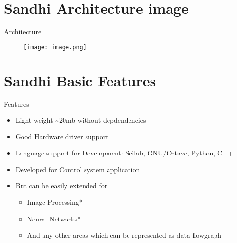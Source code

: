 \documentclass{beamer}
\begin{document}
\section{Sandhi Architecture image}
\begin{frame}{Architecture}

\begin{figure} [ht!]
	\centering
	\texttt{[image: image.png]}
\end{figure}
\vskip 1cm
\end{frame}

\section{Sandhi Basic Features}
\begin{frame}{Features}

\begin{itemize}
  \item Light-weight \textasciitilde 20mb without depdendencies
  \item Good Hardware driver support
  \item Language support for Development: Scilab, GNU/Octave, Python, C++
  \item Developed for Control system application
  \item But can be easily extended for
  \begin{itemize}
  	\item Image Processing*
	\item Neural Networks*
	\item And any other areas which can be represented as data-flowgraph
  \end{itemize}
\end{itemize}
\vskip 1cm
\end{frame}


\end{document}
